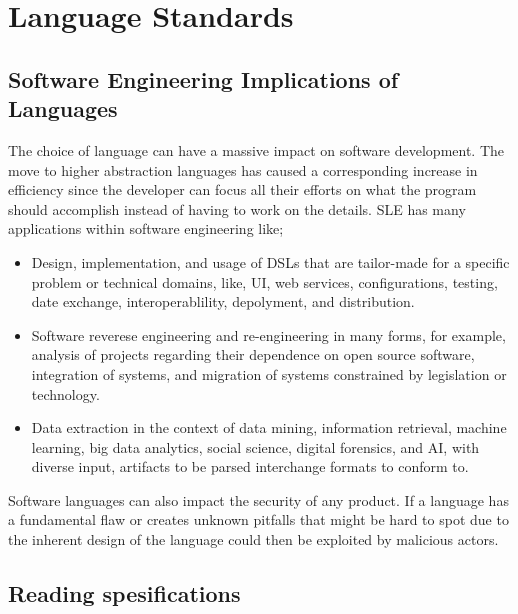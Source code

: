 \documentclass{article}
\begin{document}
    \section{Language Standards}
        \subsection{Software Engineering Implications of Languages}
        The choice of language can have a massive impact on software development. The move to higher abstraction languages has caused a corresponding increase in efficiency
        since the developer can focus all their efforts on what the program should accomplish instead of having to work on the details. 
       \gls{SLE} has many applications within software engineering like;
        \begin{itemize}
            \item Design, implementation, and usage of DSLs that are tailor-made for a specific problem or technical domains, like, UI, web services, configurations, testing,
                    date exchange, interoperablility, depolyment, and distribution.
            \item Software reverese engineering and re-engineering in many forms, for example, analysis of projects regarding their dependence on open source software,
                    integration of systems, and migration of systems constrained by legislation or technology.
            \item Data extraction in the context of data mining, information retrieval, machine learning, big data analytics, social science, digital forensics, and AI, 
                    with diverse input, artifacts to be parsed interchange formats to conform to.
        \end{itemize}
        Software languages can also impact the security of any product. If a language has a fundamental flaw or creates unknown pitfalls that might be hard to spot due to
        the inherent design of the language could then be exploited by malicious actors. 
        \subsection{Reading spesifications}
\end{document}
